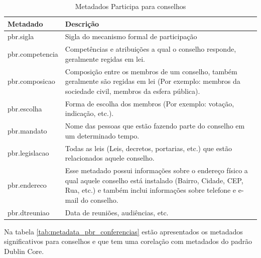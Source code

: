 \begin{table}[H]
\begin{center}
    \begin{tabular}{ | l | p{10cm} |}
    \hline
    \textbf{Metadado} & \textbf{Descrição} \\ \hline
    pbr.sigla & Sigla do mecanismo formal de participação \\ \hline
    pbr.competencia & Competências e atribuições a qual o conselho responde, geralmente regidas em lei. \\ \hline
    pbr.composicao & Composição entre os membros de um conselho, também geralmente são regidas em lei (Por exemplo: membros da sociedade civil, membros da esfera pública). \\ \hline
    pbr.escolha & Forma de escolha dos membros (Por exemplo: votação, indicação, etc.). \\ \hline
    pbr.mandato & Nome das pessoas que estão fazendo parte do conselho em um determinado tempo. \\ \hline
    pbr.legislacao & Todas as leis (Leis, decretos, portarias, etc.) que estão relacionados aquele conselho. \\ \hline
    pbr.endereco & Esse metadado possui informações sobre o endereço físico a qual aquele conselho está instalado (Bairro, Cidade, CEP, Rua, etc.) e também inclui informações sobre telefone e e-mail do conselho. \\ \hline
    pbr.dtreuniao & Data de reuniões, audiências, etc. \\ \hline
    \end{tabular}
    \caption{Metadados Participa para conselhos}
    \label{tab:metadata_pbr_conselho}
\end{center}
\end{table}


Na tabela \ref{tab:metadata_pbr_conferencias} estão apresentados os metadados significativos para conselhos e que tem uma corelação com metadados do padrão Dublin Core.


